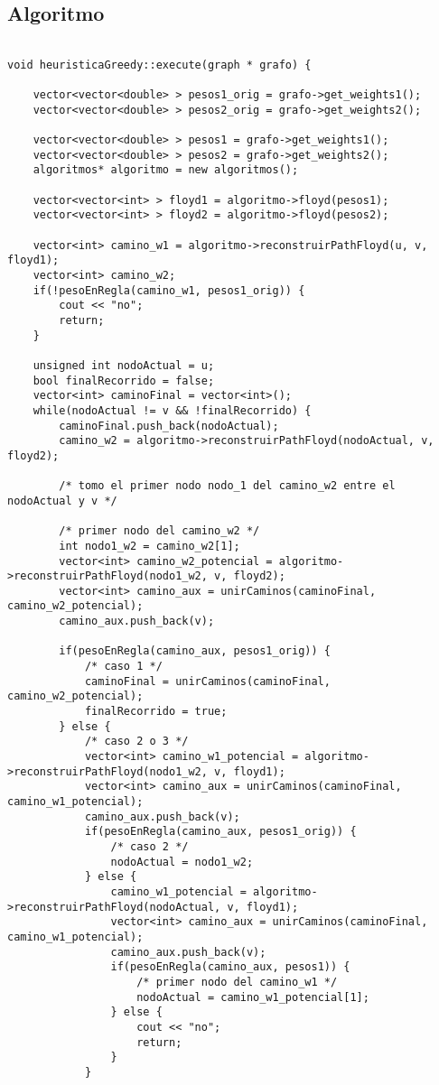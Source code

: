 \subsection{Algoritmo}
\begin{lstlisting}

void heuristicaGreedy::execute(graph * grafo) {

	vector<vector<double> > pesos1_orig = grafo->get_weights1();
	vector<vector<double> > pesos2_orig = grafo->get_weights2();

	vector<vector<double> > pesos1 = grafo->get_weights1();
	vector<vector<double> > pesos2 = grafo->get_weights2();
	algoritmos* algoritmo = new algoritmos();

	vector<vector<int> > floyd1 = algoritmo->floyd(pesos1);
	vector<vector<int> > floyd2 = algoritmo->floyd(pesos2);
	
	vector<int> camino_w1 = algoritmo->reconstruirPathFloyd(u, v, floyd1);
	vector<int> camino_w2;
	if(!pesoEnRegla(camino_w1, pesos1_orig)) {
		cout << "no";
		return;
	}

	unsigned int nodoActual = u;
	bool finalRecorrido = false;
	vector<int> caminoFinal = vector<int>();
	while(nodoActual != v && !finalRecorrido) {
		caminoFinal.push_back(nodoActual);
		camino_w2 = algoritmo->reconstruirPathFloyd(nodoActual, v, floyd2);

		/* tomo el primer nodo nodo_1 del camino_w2 entre el nodoActual y v */

		/* primer nodo del camino_w2 */
		int nodo1_w2 = camino_w2[1];
		vector<int> camino_w2_potencial = algoritmo->reconstruirPathFloyd(nodo1_w2, v, floyd2);
		vector<int> camino_aux = unirCaminos(caminoFinal, camino_w2_potencial);
		camino_aux.push_back(v);

		if(pesoEnRegla(camino_aux, pesos1_orig)) {
			/* caso 1 */
			caminoFinal = unirCaminos(caminoFinal, camino_w2_potencial);
			finalRecorrido = true;
		} else {
			/* caso 2 o 3 */
			vector<int> camino_w1_potencial = algoritmo->reconstruirPathFloyd(nodo1_w2, v, floyd1);
			vector<int> camino_aux = unirCaminos(caminoFinal, camino_w1_potencial);
			camino_aux.push_back(v);
			if(pesoEnRegla(camino_aux, pesos1_orig)) {
				/* caso 2 */
				nodoActual = nodo1_w2;
			} else {
				camino_w1_potencial = algoritmo->reconstruirPathFloyd(nodoActual, v, floyd1);
				vector<int> camino_aux = unirCaminos(caminoFinal, camino_w1_potencial);
				camino_aux.push_back(v);
				if(pesoEnRegla(camino_aux, pesos1)) {
					/* primer nodo del camino_w1 */
					nodoActual = camino_w1_potencial[1]; 				
				} else {
					cout << "no";
					return;
				}
			}
			

\end{lstlisting}
